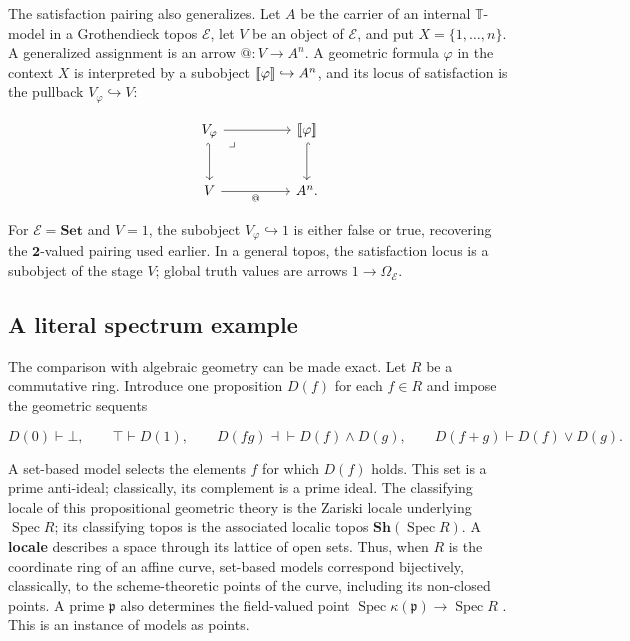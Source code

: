 \documentclass[11pt]{article}
\makeatletter
\newcommand{\llbracket}{\mathopen{[\mkern-3mu[}}
\newcommand{\rrbracket}{\mathclose{]\mkern-3mu]}}
\newcommand{\atsign}{\mathord{@}}
\makeatother
\begin{document}
The satisfaction pairing also generalizes. Let \(A\) be the carrier of an
internal \(\mathbb T\)-model in a Grothendieck topos \(\mathcal E\), let
\(V\) be an object of \(\mathcal E\), and put \(X=\{1,\ldots,n\}\). A
generalized assignment is an arrow \(\atsign:V\to A^n\). A geometric formula
\(\varphi\) in the context \(X\) is interpreted by a subobject
\(\llbracket\varphi\rrbracket\hookrightarrow A^n\), and its locus of
satisfaction is the pullback \(V_\varphi\hookrightarrow V\):

\[
\begin{tikzcd}[row sep=large,column sep=huge]
V_\varphi \arrow[r] \arrow[d,hook']
  \arrow[dr,phantom,"\lrcorner",very near start] &
\llbracket\varphi\rrbracket \arrow[d,hook] \\
V \arrow[r,"\atsign"'] & A^n .
\end{tikzcd}
\]

For \(\mathcal E=\mathbf{Set}\) and \(V=1\), the subobject
\(V_\varphi\hookrightarrow1\) is either false or true, recovering the
\(\mathbf2\)-valued pairing used earlier. In a general topos, the satisfaction
locus is a subobject of the stage \(V\); global truth values are arrows
\(1\to\Omega_{\mathcal E}\).

\subsection{A literal spectrum example}

The comparison with algebraic geometry can be made exact. Let \(R\) be a
commutative ring. Introduce one proposition \(D(f)\) for each \(f\in R\) and
impose the geometric sequents \cite{Manuell2022}

\[
D(0)\vdash\bot,\qquad
\top\vdash D(1),\qquad
D(fg)\dashv\vdash D(f)\wedge D(g),\qquad
D(f+g)\vdash D(f)\vee D(g).
\]

A set-based model selects the elements \(f\) for which \(D(f)\) holds. This
set is a prime anti-ideal; classically, its complement is a prime ideal. The
classifying locale of this propositional geometric theory is the Zariski locale
underlying \(\operatorname{Spec}R\); its classifying topos is the associated
localic topos \(\mathbf{Sh}(\operatorname{Spec}R)\). A \textbf{locale} describes a
space through its lattice of open sets. Thus, when
\(R\) is the coordinate
ring of an affine curve, set-based models correspond bijectively, classically,
to the scheme-theoretic points of the curve, including its non-closed points. A prime
\(\mathfrak p\) also determines the field-valued point
\(\operatorname{Spec}\kappa(\mathfrak p)\to\operatorname{Spec}R\)
\cite{StacksPoints}. This is an instance of models as points.
\end{document}
